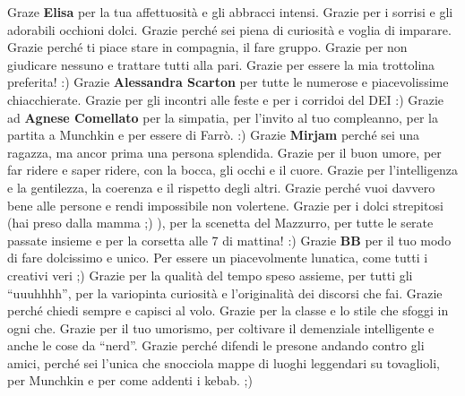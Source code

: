 \documentclass[10pt]{amsart}
\newcommand{\n}[1]{{\Large \bf #1}}
\begin{document}
Graze \n{Elisa} per la tua affettuosità e gli abbracci intensi. Grazie per i sorrisi e gli adorabili occhioni dolci. Grazie perché sei piena di curiosità e voglia di imparare. Grazie perché ti piace stare in compagnia, il fare gruppo. Grazie per non giudicare nessuno e trattare tutti alla pari. Grazie per essere la mia trottolina preferita! :) Grazie \n{Alessandra Scarton} per tutte le numerose e piacevolissime chiacchierate. Grazie per gli incontri alle feste e per i corridoi del DEI :) Grazie ad \n{Agnese Comellato} per la simpatia, per l'invito al tuo compleanno, per la partita a Munchkin e per essere di Farrò. :)
Grazie \n{Mirjam} perché sei una ragazza, ma ancor prima una persona splendida. Grazie per il buon umore, per far ridere e saper ridere, con la bocca, gli occhi e il cuore. Grazie per l'intelligenza  e la gentilezza, la coerenza e il rispetto degli altri. Grazie perché vuoi davvero bene alle persone e rendi impossibile non volertene. Grazie per i dolci strepitosi (hai preso dalla mamma ;) ), per la scenetta del Mazzurro, per tutte le serate passate insieme e per la corsetta alle 7 di mattina! :)
Grazie \n{BB} per il tuo modo di fare dolcissimo e unico. Per essere un piacevolmente lunatica, come tutti i creativi veri ;)  Grazie per la qualità del tempo speso assieme, per tutti gli ``uuuhhhh'', per la variopinta curiosità e l'originalità dei discorsi che fai. Grazie perché chiedi sempre e capisci al volo. Grazie per la classe e lo stile che sfoggi in ogni che. Grazie per il tuo umorismo, per coltivare il demenziale intelligente e anche le cose da ``nerd''. Grazie perché difendi le presone andando contro gli amici, perché sei l'unica che snocciola mappe di luoghi leggendari su tovaglioli, per Munchkin e per come addenti i kebab. ;)\\
\end{document}
